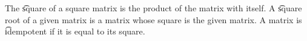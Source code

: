 



The \t{square} of a square matrix is the product of the matrix with itself.
A \t{square root} of a given matrix is a matrix whose square is the given matrix.
A matrix is \t{idempotent} if it is equal to its square.

